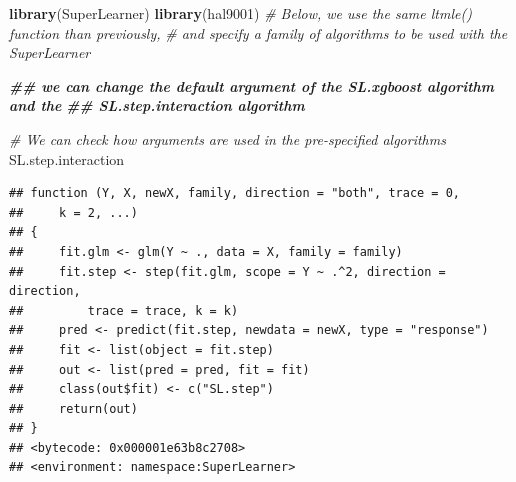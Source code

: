 \documentclass[
]{book}
\newenvironment{Shaded}{\begin{snugshade}}{\end{snugshade}}
\newcommand{\AttributeTok}[1]{\textcolor[rgb]{0.13,0.29,0.53}{#1}}
\newcommand{\CommentTok}[1]{\textcolor[rgb]{0.56,0.35,0.01}{\textit{#1}}}
\newcommand{\ControlFlowTok}[1]{\textcolor[rgb]{0.13,0.29,0.53}{\textbf{#1}}}
\newcommand{\DocumentationTok}[1]{\textcolor[rgb]{0.56,0.35,0.01}{\textbf{\textit{#1}}}}
\newcommand{\FunctionTok}[1]{\textcolor[rgb]{0.13,0.29,0.53}{\textbf{#1}}}
\newcommand{\NormalTok}[1]{#1}
\newcommand{\OtherTok}[1]{\textcolor[rgb]{0.56,0.35,0.01}{#1}}
\newcommand{\StringTok}[1]{\textcolor[rgb]{0.31,0.60,0.02}{#1}}
\begin{document}
\begin{Shaded}
\begin{Highlighting}[]
\FunctionTok{library}\NormalTok{(SuperLearner)}
\FunctionTok{library}\NormalTok{(hal9001)}
\CommentTok{\# Below, we use the same ltmle() function than previously, }
\CommentTok{\# and specify a family of algorithms to be used with the SuperLearner}

\DocumentationTok{\#\# we can change the default argument of the SL.xgboost algorithm and the }
\DocumentationTok{\#\# SL.step.interaction algorithm}

\CommentTok{\# We can check how arguments are used in the pre{-}specified algorithms}
\NormalTok{SL.step.interaction}
\end{Highlighting}
\end{Shaded}

\begin{verbatim}
## function (Y, X, newX, family, direction = "both", trace = 0, 
##     k = 2, ...) 
## {
##     fit.glm <- glm(Y ~ ., data = X, family = family)
##     fit.step <- step(fit.glm, scope = Y ~ .^2, direction = direction, 
##         trace = trace, k = k)
##     pred <- predict(fit.step, newdata = newX, type = "response")
##     fit <- list(object = fit.step)
##     out <- list(pred = pred, fit = fit)
##     class(out$fit) <- c("SL.step")
##     return(out)
## }
## <bytecode: 0x000001e63b8c2708>
## <environment: namespace:SuperLearner>
\end{verbatim}

\begin{Shaded}
\end{Shaded}
\end{document}
